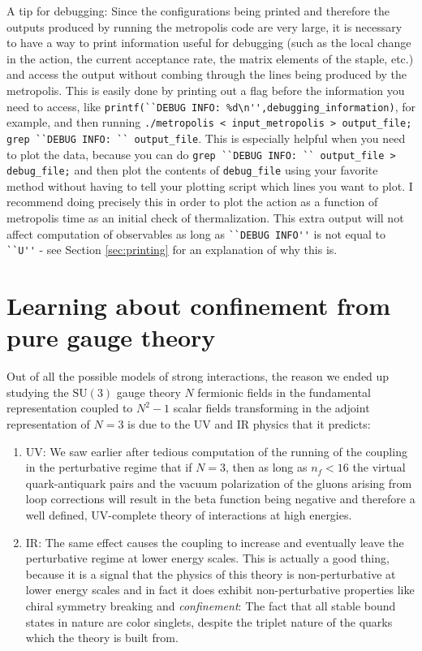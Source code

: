 \documentclass[11pt]{article}
\begin{document}
A tip for debugging: Since the configurations being printed and therefore the outputs produced by running the metropolis code are very large, it is necessary to have a way to print information useful for debugging (such as the local change in the action, the current acceptance rate, the matrix elements of the staple, etc.) and access the output without combing through the lines being produced by the metropolis. This is easily done by printing out a flag before the information you need to access, like \lstinline{printf(``DEBUG INFO: %d\n'',debugging_information)}, for example, and then running \lstinline{./metropolis < input_metropolis > output_file; grep ``DEBUG INFO: `` output_file}. This is especially helpful when you need to plot the data, because you can do \lstinline{grep ``DEBUG INFO: `` output_file > debug_file;} and then plot the contents of \lstinline{debug_file} using your favorite method without having to tell your plotting script which lines you want to plot. I recommend doing precisely this in order to plot the action as a function of metropolis time as an initial check of thermalization. This extra output will not affect computation of observables as long as \lstinline{``DEBUG INFO''} is not equal to \lstinline{``U''} - see Section \ref{sec:printing} for an explanation of why this is.\\

\section{Learning about confinement from pure gauge theory}

\label{sec:confinement}

Out of all the possible models of strong interactions, the reason we ended up studying the $\mathrm{SU}(3)$ gauge theory $N$ fermionic fields in the fundamental representation coupled to $N^2-1$ scalar fields transforming in the adjoint representation of $N=3$ is due to the UV and IR physics that it predicts:

\begin{enumerate}
\item UV: We saw earlier after tedious computation of the running of the coupling in the perturbative regime that if $N=3$, then as long as $n_f<16$ the virtual quark-antiquark pairs and the vacuum polarization of the gluons arising from loop corrections will result in the beta function being negative and therefore a well defined, UV-complete theory of interactions at high energies.
\item IR: The same effect causes the coupling to increase and eventually leave the perturbative regime at lower energy scales. This is actually a good thing, because it is a signal that the physics of this theory is non-perturbative at lower energy scales and in fact it does exhibit non-perturbative properties like chiral symmetry breaking and \textit{confinement}: The fact that all stable bound states in nature are color singlets, despite the triplet nature of the quarks which the theory is built from. 
\end{enumerate}
\end{document}
